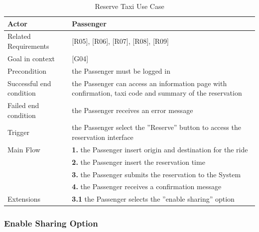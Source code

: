 \begin{table}[htbp]
\begin{center}
\begin{tabular}[t]{p{}p{}}

\hline
Actor & Passenger \\
\hline
Related Requirements & [R05], [R06], [R07], [R08], [R09] \\
\hline
Goal in context & [G04] \\
\hline
Precondition & the Passenger must be logged in \\
\hline
Successful end condition & 
the Passenger can access an information page with confirmation, taxi code and summary of the reservation
 \\
\hline
Failed end condition & the Passenger receives an error message  \\
\hline
Trigger & the Passenger select the ''Reserve'' button to access the reservation interface \\
\hline
Main Flow & \textbf{1.} the Passenger insert origin and destination for the ride \\
& \textbf{2.} the Passenger insert the reservation time \\
& \textbf{3.} the Passenger submits the reservation to the System \\
& \textbf{4.} the Passenger receives a confirmation message \\
\hline
Extensions & \textbf{3.1} the Passenger selects the ''enable sharing'' option \\
\hline

\end{tabular}
\end{center}
\caption{Reserve Taxi Use Case}
\end{table}
\clearpage

\subsubsection{Enable Sharing Option}

